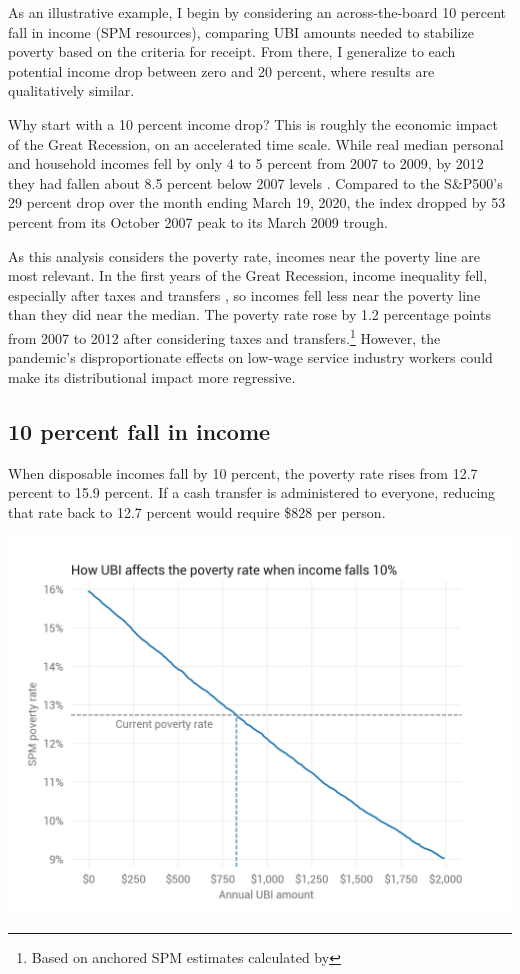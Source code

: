 \documentclass[12pt]{article}
\begin{document}
As an illustrative example, I begin by considering an across-the-board 10 percent fall in income (SPM resources), comparing UBI amounts needed to stabilize poverty based on the criteria for receipt. From there, I generalize to each potential income drop between zero and 20 percent, where results are qualitatively similar.

Why start with a 10 percent income drop? This is roughly the economic impact of the Great Recession, on an accelerated time scale. While real median personal and household incomes fell by only 4 to 5 percent from 2007 to 2009, by 2012 they had fallen about 8.5 percent below 2007 levels \cite{fred_income}. Compared to the S\&P500's 29 percent drop over the month ending March 19, 2020, the index dropped by 53 percent from its October 2007 peak to its March 2009 trough.

As this analysis considers the poverty rate, incomes near the poverty line are most relevant. In the first years of the Great Recession, income inequality fell, especially after taxes and transfers \cite{cbo}, so incomes fell less near the poverty line than they did near the median. The poverty rate rose by 1.2 percentage points from 2007 to 2012 after considering taxes and transfers.\footnote{Based on anchored SPM estimates calculated by } However, the pandemic's disproportionate effects on low-wage service industry workers could make its distributional impact more regressive.

\subsection{10 percent fall in income} \label{sec:10pctfall}

When disposable incomes fall by 10 percent, the poverty rate rises from 12.7 percent to 15.9 percent. If a cash transfer is administered to everyone, reducing that rate back to 12.7 percent would require \$828 per person.

\begin{center}
\includegraphics[width=15cm]{charts/pov_rate_by_ubi_10pct_all.png}
\label{fig:poverty}
\end{center}
\end{document}
